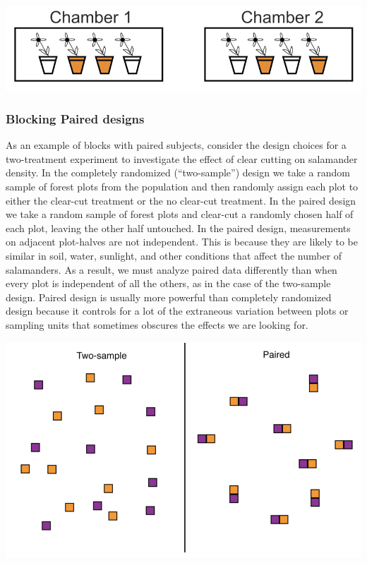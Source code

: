 \documentclass[]{book}
\begin{document}
\includegraphics[width=12.28in]{images/images_6a.008}

\hypertarget{blocking-paired-designs}{%
\subsubsection{Blocking \textbar{} Paired designs}\label{blocking-paired-designs}}

As an example of blocks with paired subjects, consider the design choices for a two-treatment experiment to investigate the effect of clear cutting on salamander density. In the completely randomized (``two-sample'') design we take a random sample of forest plots from the population and then randomly assign each plot to either the clear-cut treatment or the no clear-cut treatment. In the paired design we take a random sample of forest plots and clear-cut a randomly chosen half of each plot, leaving the other half untouched. In the paired design, measurements on adjacent plot-halves are not independent. This is because they are likely to be similar in soil, water, sunlight, and other conditions that affect the number of salamanders. As a result, we must analyze paired data differently than when every plot is independent of all the others, as in the case of the two-sample design. Paired design is usually more powerful than completely randomized design because it controls for a lot of the extraneous variation between plots or sampling units that sometimes obscures the effects we are looking for.

\begin{center}\includegraphics[width=0.9\linewidth]{images/images_6a.009} \end{center}
\end{document}
